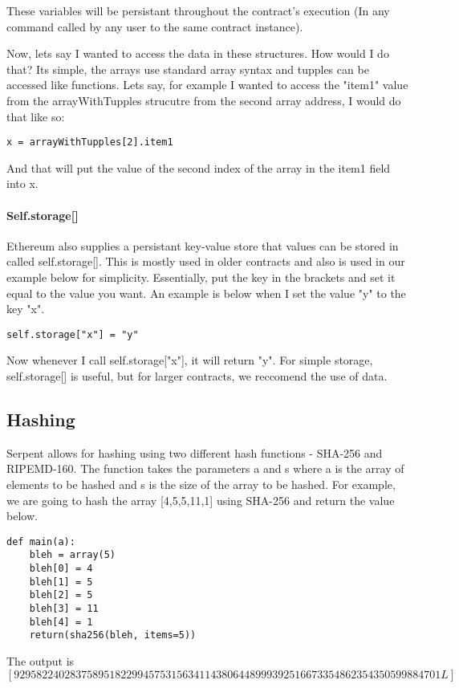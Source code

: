 \documentclass[12pt]{article}
\begin{document}
These variables will be persistant throughout the contract's execution (In any command called by any user to the same contract instance).

Now, lets say I wanted to access the data in these structures. How would I do that? Its simple, the arrays use standard array syntax and tupples can be accessed like functions. Lets say, for example I wanted to access the "item1" value from the arrayWithTupples strucutre from the second array address, I would do that like so:

\begin{lstlisting}
x = arrayWithTupples[2].item1
\end{lstlisting}

And that will put the value of the second index of the array in the item1 field into x. \cite{Serpent}

\paragraph{Self.storage[]}
Ethereum also supplies a persistant key-value store that values can be stored in called self.storage[]. This is mostly used in older contracts and also is used in our example below for simplicity. Essentially, put the key in the brackets and set it equal to the value you want. An example is below when I set the value "y" to the key "x".

\begin{lstlisting}
self.storage["x"] = "y"
\end{lstlisting}

Now whenever I call self.storage["x"], it will return "y". For simple storage, self.storage[] is useful, but for larger contracts, we reccomend the use of data. \cite{Serpent, Serpent 1.0 (old)}

\subsection{Hashing}
Serpent allows for hashing using two different hash functions - SHA-256 and RIPEMD-160. The function takes the parameters a and s where a is the array of elements to be hashed and s is the size of the array to be hashed. For example, we are going to hash the array [4,5,5,11,1] using SHA-256 and return the value below. \cite{Serpent}

\begin{lstlisting}
def main(a):
	bleh = array(5)
	bleh[0] = 4
	bleh[1] = 5
	bleh[2] = 5
	bleh[3] = 11
	bleh[4] = 1
	return(sha256(bleh, items=5))
\end{lstlisting}
The output is $[9295822402837589518229945753156341143806448999392516673354862354350599884701L]$
\end{document}
